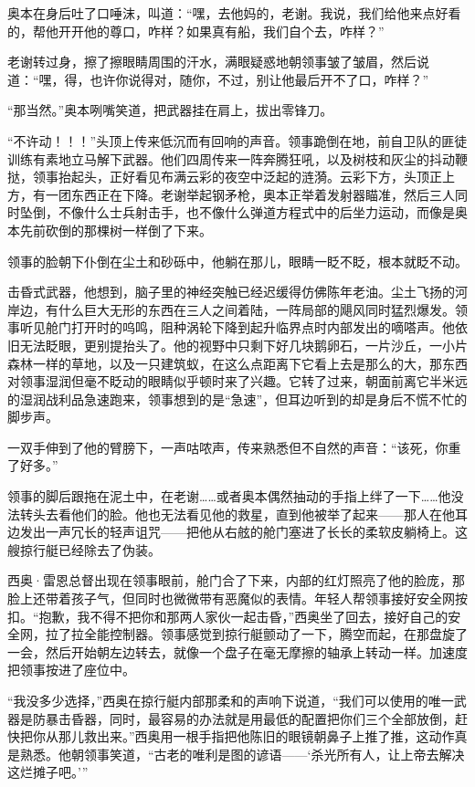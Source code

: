 \documentclass[AutoFakeBold=true]{book}
\begin{document}
奥本在身后吐了口唾沫，叫道：``嘿，去他妈的，老谢。我说，我们给他来点好看的，帮他开开他的尊口，咋样？如果真有船，我们自个去，咋样？''

老谢转过身，擦了擦眼睛周围的汗水，满眼疑惑地朝领事皱了皱眉，然后说道：``嘿，得，也许你说得对，随你，不过，别让他最后开不了口，咋样？''

``那当然。''奥本咧嘴笑道，把武器挂在肩上，拔出零锋刀。

``不许动！！！''头顶上传来低沉而有回响的声音。领事跪倒在地，前自卫队的匪徒训练有素地立马解下武器。他们四周传来一阵奔腾狂吼，以及树枝和灰尘的抖动鞭挞，领事抬起头，正好看见布满云彩的夜空中泛起的涟漪。云彩下方，头顶正上方，有一团东西正在下降。老谢举起钢矛枪，奥本正举着发射器瞄准，然后三人同时坠倒，不像什么士兵射击手，也不像什么弹道方程式中的后坐力运动，而像是奥本先前砍倒的那棵树一样倒了下来。

领事的脸朝下仆倒在尘土和砂砾中，他躺在那儿，眼睛一眨不眨，根本就眨不动。

{\kaishu 击昏式武器}，他想到，脑子里的神经突触已经迟缓得仿佛陈年老油。尘土飞扬的河岸边，有什么巨大无形的东西在三人之间着陆，一阵局部的飓风同时猛烈爆发。领事听见舱门打开时的呜鸣，阻种涡轮下降到起升临界点时内部发出的嘀嗒声。他依旧无法眨眼，更别提抬头了。他的视野中只剩下好几块鹅卵石，一片沙丘，一小片森林一样的草地，以及一只建筑蚁，在这么点距离下它看上去是那么的大，那东西对领事湿润但毫不眨动的眼睛似乎顿时来了兴趣。它转了过来，朝面前离它半米远的湿润战利品急速跑来，领事想到的是``急速''，但耳边听到的却是身后不慌不忙的脚步声。

一双手伸到了他的臂膀下，一声咕哝声，传来熟悉但不自然的声音：``该死，你重了好多。''

领事的脚后跟拖在泥土中，在老谢……或者奥本偶然抽动的手指上绊了一下……他没法转头去看他们的脸。他也无法看见他的救星，直到他被举了起来——那人在他耳边发出一声冗长的轻声诅咒——把他从右舷的舱门塞进了长长的柔软皮躺椅上。这艘掠行艇已经除去了伪装。

西奥·雷恩总督出现在领事眼前，舱门合了下来，内部的红灯照亮了他的脸庞，那脸上还带着孩子气，但同时也微微带有恶魔似的表情。年轻人帮领事接好安全网按扣。``抱歉，我不得不把你和那两人家伙一起击昏，''西奥坐了回去，接好自己的安全网，拉了拉全能控制器。领事感觉到掠行艇颤动了一下，腾空而起，在那盘旋了一会，然后开始朝左边转去，就像一个盘子在毫无摩擦的轴承上转动一样。加速度把领事按进了座位中。

``我没多少选择，''西奥在掠行艇内部那柔和的声响下说道，``我们可以使用的唯一武器是防暴击昏器，同时，最容易的办法就是用最低的配置把你们三个全部放倒，赶快把你从那儿救出来。''西奥用一根手指把他陈旧的眼镜朝鼻子上推了推，这动作真是熟悉。他朝领事笑道，``古老的唯利是图的谚语——`杀光所有人，让上帝去解决这烂摊子吧。'''
\end{document}
